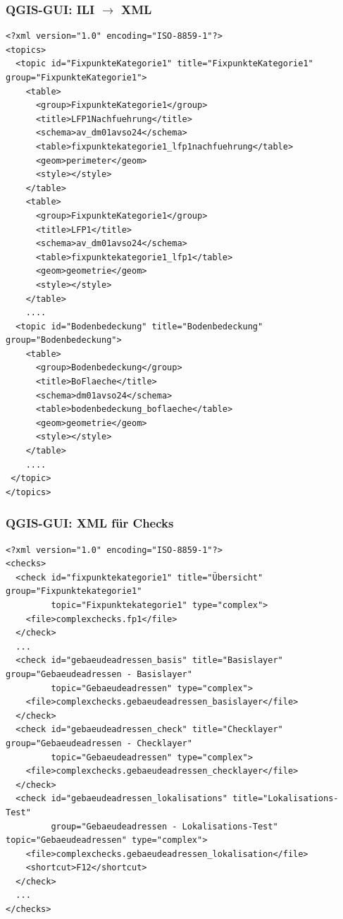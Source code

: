 \documentclass{beamer}
\begin{document}
\begin{frame}[fragile]
  \frametitle{QGIS-GUI: ILI $\rightarrow$ XML}
  \begin{tiny}
  \begin{verbatim}
<?xml version="1.0" encoding="ISO-8859-1"?>
<topics>
  <topic id="FixpunkteKategorie1" title="FixpunkteKategorie1" group="FixpunkteKategorie1">
    <table>
      <group>FixpunkteKategorie1</group>
      <title>LFP1Nachfuehrung</title>
      <schema>av_dm01avso24</schema>
      <table>fixpunktekategorie1_lfp1nachfuehrung</table>
      <geom>perimeter</geom>
      <style></style>
    </table>
    <table>
      <group>FixpunkteKategorie1</group>
      <title>LFP1</title>
      <schema>av_dm01avso24</schema>
      <table>fixpunktekategorie1_lfp1</table>
      <geom>geometrie</geom>
      <style></style>
    </table>
    ....
  <topic id="Bodenbedeckung" title="Bodenbedeckung" group="Bodenbedeckung">   
    <table>
      <group>Bodenbedeckung</group>
      <title>BoFlaeche</title>
      <schema>dm01avso24</schema>
      <table>bodenbedeckung_boflaeche</table>
      <geom>geometrie</geom>
      <style></style>
    </table>
    ....
 </topic>
</topics>    
  \end{verbatim}
  \end{tiny}
\end{frame}


\begin{frame}[fragile]
  \frametitle{QGIS-GUI: XML für Checks}
  \begin{tiny}
  \begin{verbatim}
<?xml version="1.0" encoding="ISO-8859-1"?>
<checks>
  <check id="fixpunktekategorie1" title="Übersicht" group="Fixpunktekategorie1" 
         topic="Fixpunktekategorie1" type="complex">
    <file>complexchecks.fp1</file>
  </check>
  ...  
  <check id="gebaeudeadressen_basis" title="Basislayer" group="Gebaeudeadressen - Basislayer" 
         topic="Gebaeudeadressen" type="complex">
    <file>complexchecks.gebaeudeadressen_basislayer</file>
  </check>   
  <check id="gebaeudeadressen_check" title="Checklayer" group="Gebaeudeadressen - Checklayer" 
         topic="Gebaeudeadressen" type="complex">
    <file>complexchecks.gebaeudeadressen_checklayer</file>
  </check>    
  <check id="gebaeudeadressen_lokalisations" title="Lokalisations-Test" 
         group="Gebaeudeadressen - Lokalisations-Test" topic="Gebaeudeadressen" type="complex">
    <file>complexchecks.gebaeudeadressen_lokalisation</file>
    <shortcut>F12</shortcut>
  </check>           
  ...
</checks>   
  \end{verbatim}
  \end{tiny}
\end{frame}
\end{document}

